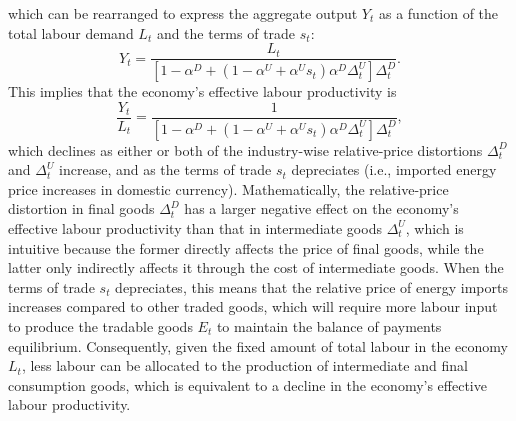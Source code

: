 \documentclass[a4paper, 12pt]{article}
\theoremstyle{definition*}
\begin{document}
which can be rearranged to express the aggregate output $Y_t$ as a function of the total labour demand $L_t$ and the terms of trade $s_t$:
\begin{equation} \label{eq:prod}
  Y_t = \frac{L_t}{[1 - \alpha^D + (1 - \alpha^U + \alpha^Us_t)\alpha^D\Delta^U_t]\Delta^D_t}.
\end{equation}
This implies that the economy's effective labour productivity is
\begin{equation}
  \frac{Y_t}{L_t} = \frac{1}{[1 - \alpha^D + (1 - \alpha^U + \alpha^Us_t)\alpha^D\Delta^U_t]\Delta^D_t},
\end{equation}
which declines as either or both of the industry-wise relative-price distortions $\Delta^D_t$ and $\Delta^U_t$ increase, and as the terms of trade $s_t$ depreciates (i.e., imported energy price increases in domestic currency).
Mathematically, the relative-price distortion in final goods $\Delta^D_t$ has a larger negative effect on the economy's effective labour productivity than that in intermediate goods $\Delta^U_t$, which is intuitive because the former directly affects the price of final goods, while the latter only indirectly affects it through the cost of intermediate goods.
When the terms of trade $s_t$ depreciates, this means that the relative price of energy imports increases compared to other traded goods, which will require more labour input to produce the tradable goods $E_t$ to maintain the balance of payments equilibrium.
Consequently, given the fixed amount of total labour in the economy $L_t$, less labour can be allocated to the production of intermediate and final consumption goods, which is equivalent to a decline in the economy's effective labour productivity.
\end{document}
